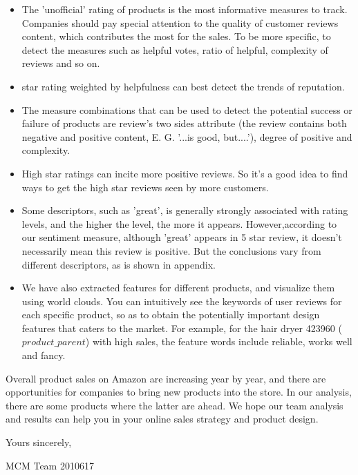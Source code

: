 \documentclass{mcmthesis}
\begin{document}
\begin{memo}
 \begin{itemize}
\item  The 'unofficial' rating of products is the most informative measures to track. Companies should pay special attention to the quality of customer reviews content, which contributes the most for the sales. To be more specific, to detect the measures such as helpful votes, ratio of helpful, complexity of reviews and so on.
\item  star rating weighted by helpfulness can best detect the trends of reputation.
\item  The measure combinations that can be used to detect the potential success or failure of products are review's two sides attribute (the review contains both negative and positive content, E. G. '...is good, but....'), degree of positive and complexity.
\item  High star ratings can incite more positive reviews. So it's a good idea to find ways to get the high star reviews seen by more customers.
\item  Some descriptors, such as ’great’, is generally strongly associated with rating levels, and the higher the level, the more it appears. However,according to our sentiment measure, although ’great’ appears in 5 star review, it doesn’t necessarily mean this review is positive. But the conclusions vary from different descriptors, as is shown in appendix.
\item We have also extracted features for different products, and visualize them using world clouds. You can intuitively see the keywords of user reviews for each specific product, so as to obtain the potentially important design features that caters to the market. For example, for the hair dryer 423960 ($product\_parent$) with high sales, the feature words include reliable, works well and fancy.
\end{itemize}

Overall product sales on Amazon are increasing year by year, and there are opportunities for companies to bring new products into the store. In our analysis, there are some products where the latter are ahead. We hope our team analysis and results can help you in your online sales strategy and product design. 


Yours sincerely,

MCM Team 2010617



\end{memo}
\end{document}
